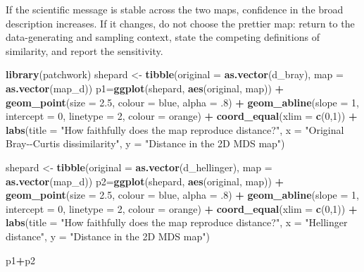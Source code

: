 \documentclass[
  english,
]{article}
\newenvironment{Shaded}{\begin{snugshade}}{\end{snugshade}}
\newcommand{\AttributeTok}[1]{\textcolor[rgb]{0.13,0.29,0.53}{#1}}
\newcommand{\DecValTok}[1]{\textcolor[rgb]{0.00,0.00,0.81}{#1}}
\newcommand{\FloatTok}[1]{\textcolor[rgb]{0.00,0.00,0.81}{#1}}
\newcommand{\FunctionTok}[1]{\textcolor[rgb]{0.13,0.29,0.53}{\textbf{#1}}}
\newcommand{\NormalTok}[1]{#1}
\newcommand{\OtherTok}[1]{\textcolor[rgb]{0.56,0.35,0.01}{#1}}
\newcommand{\SpecialCharTok}[1]{\textcolor[rgb]{0.81,0.36,0.00}{\textbf{#1}}}
\newcommand{\StringTok}[1]{\textcolor[rgb]{0.31,0.60,0.02}{#1}}
\begin{document}
If the scientific message is stable across the two maps, confidence in
the broad description increases. If it changes, do not choose the
prettier map: return to the data-generating and sampling context, state
the competing definitions of similarity, and report the sensitivity.

\begin{Shaded}
\begin{Highlighting}[]
\FunctionTok{library}\NormalTok{(patchwork)}
\NormalTok{shepard }\OtherTok{\textless{}{-}} \FunctionTok{tibble}\NormalTok{(}\AttributeTok{original =} \FunctionTok{as.vector}\NormalTok{(d\_bray), }\AttributeTok{map =} \FunctionTok{as.vector}\NormalTok{(map\_d))}
\NormalTok{p1}\OtherTok{=}\FunctionTok{ggplot}\NormalTok{(shepard, }\FunctionTok{aes}\NormalTok{(original, map)) }\SpecialCharTok{+}
  \FunctionTok{geom\_point}\NormalTok{(}\AttributeTok{size =} \FloatTok{2.5}\NormalTok{, }\AttributeTok{colour =}\NormalTok{ blue, }\AttributeTok{alpha =} \FloatTok{.8}\NormalTok{) }\SpecialCharTok{+}
  \FunctionTok{geom\_abline}\NormalTok{(}\AttributeTok{slope =} \DecValTok{1}\NormalTok{, }\AttributeTok{intercept =} \DecValTok{0}\NormalTok{, }\AttributeTok{linetype =} \DecValTok{2}\NormalTok{, }\AttributeTok{colour =}\NormalTok{ orange) }\SpecialCharTok{+}
  \FunctionTok{coord\_equal}\NormalTok{(}\AttributeTok{xlim =} \FunctionTok{c}\NormalTok{(}\DecValTok{0}\NormalTok{,}\DecValTok{1}\NormalTok{)) }\SpecialCharTok{+} 
  \FunctionTok{labs}\NormalTok{(}\AttributeTok{title =} \StringTok{"How faithfully does the map reproduce distance?"}\NormalTok{, }\AttributeTok{x =} \StringTok{"Original Bray{-}{-}Curtis dissimilarity"}\NormalTok{, }\AttributeTok{y =} \StringTok{"Distance in the 2D MDS map"}\NormalTok{)}


\NormalTok{shepard }\OtherTok{\textless{}{-}} \FunctionTok{tibble}\NormalTok{(}\AttributeTok{original =} \FunctionTok{as.vector}\NormalTok{(d\_hellinger), }\AttributeTok{map =} \FunctionTok{as.vector}\NormalTok{(map\_d))}
\NormalTok{p2}\OtherTok{=}\FunctionTok{ggplot}\NormalTok{(shepard, }\FunctionTok{aes}\NormalTok{(original, map)) }\SpecialCharTok{+}
  \FunctionTok{geom\_point}\NormalTok{(}\AttributeTok{size =} \FloatTok{2.5}\NormalTok{, }\AttributeTok{colour =}\NormalTok{ blue, }\AttributeTok{alpha =} \FloatTok{.8}\NormalTok{) }\SpecialCharTok{+}
  \FunctionTok{geom\_abline}\NormalTok{(}\AttributeTok{slope =} \DecValTok{1}\NormalTok{, }\AttributeTok{intercept =} \DecValTok{0}\NormalTok{, }\AttributeTok{linetype =} \DecValTok{2}\NormalTok{, }\AttributeTok{colour =}\NormalTok{ orange) }\SpecialCharTok{+}
  \FunctionTok{coord\_equal}\NormalTok{(}\AttributeTok{xlim =} \FunctionTok{c}\NormalTok{(}\DecValTok{0}\NormalTok{,}\DecValTok{1}\NormalTok{)) }\SpecialCharTok{+} 
  \FunctionTok{labs}\NormalTok{(}\AttributeTok{title =} \StringTok{"How faithfully does the map reproduce distance?"}\NormalTok{, }\AttributeTok{x =} \StringTok{"Hellinger distance"}\NormalTok{, }\AttributeTok{y =} \StringTok{"Distance in the 2D MDS map"}\NormalTok{)}

\NormalTok{p1}\SpecialCharTok{+}\NormalTok{p2}
\end{Highlighting}
\end{Shaded}
\end{document}
